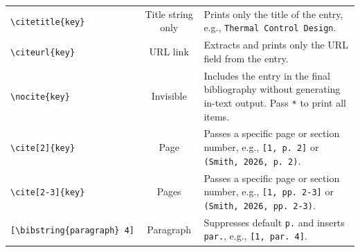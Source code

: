 \begin{tabularx}{\linewidth}{@{}lcL@{}}
		\texttt{\textbackslash citetitle\{key\}}    & Title string only     & Prints only the title of the entry, e.g., \texttt{Thermal Control Design}. \\
		\addlinespace
		
		\texttt{\textbackslash citeurl\{key\}}      & URL link              & Extracts and prints only the URL field from the entry. \\
		\addlinespace
		
		\texttt{\textbackslash nocite\{key\}}       & Invisible             & Includes the entry in the final bibliography without generating in-text output. Pass \texttt{*} to print all items. \\
		
		\midrule
		
		\texttt{\textbackslash cite[2]\{key\}} 		& Page 					& Passes a specific page or section number, e.g., \texttt{[1, p. 2]} or \texttt{(Smith, 2026, p. 2)}. \\
		\addlinespace
		
		\texttt{\textbackslash cite[2-3]\{key\}} 	& Pages 				& Passes a specific page or section number, e.g., \texttt{[1, pp. 2-3]} or \texttt{(Smith, 2026, pp. 2-3)}. \\
		\addlinespace
		
		\texttt{[\textbackslash bibstring\{paragraph\}~4]} & Paragraph & Suppresses default \texttt{p.} and inserts \texttt{par.}, e.g., \texttt{[1, par. 4]}. \\
	\end{tabularx}
	
